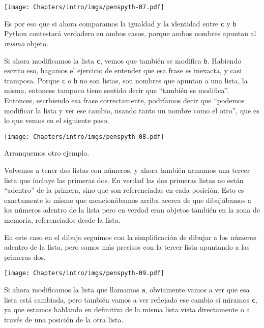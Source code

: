 
\begin{center}
    \texttt{[image: Chapters/intro/imgs/penspyth-07.pdf]}
\end{center}

Es por eso que si ahora comparamos la igualdad y la identidad entre \verb|c| y \verb|b| Python contestará verdadero en ambos casos, porque ambos nombres apuntan al \textit{mismo} objeto.

Si ahora modificamos la lista \verb|c|, vemos que también se modifica \verb|b|. Habiendo escrito eso, hagamos el ejercicio de entender que esa frase es inexacta, y casi tramposa. Porque \verb|c| o \verb|b| no son listas, son nombres que apuntan a una lista, la misma, entonces tampoco tiene sentido decir que ``también se modifica''. Entonces, escrbiendo esa frase correctamente, podríamos decir que ``podemos modificar la lista y ver ese cambio, usando tanto un nombre como el otro'', que es lo que vemos en el siguiente paso.


\begin{center}
    \texttt{[image: Chapters/intro/imgs/penspyth-08.pdf]}
\end{center}

Arranquemos otro ejemplo. 

Volvemos a tener dos listas con números, y ahora también armamos una tercer lista que incluye las primeras dos. En verdad las dos primeras listas no están ``adentro'' de la primera, sino que son referenciadas en cada posición. Esto es exactamente lo mismo que mencionábamos arriba acerca de que dibujábamos a los números adentro de la lista pero en verdad eran objetos también en la zona de memoria, referenciados desde la lista. 

En este caso en el dibujo seguimos con la simplificación de dibujar a los números adentro de la lista, pero somos más precisos con la tercer lista apuntando a las primeras dos.


\begin{center}
    \texttt{[image: Chapters/intro/imgs/penspyth-09.pdf]}
\end{center}

Si ahora modificamos la lista que llamamos \verb|a|, obviamente vamos a ver que esa lista está cambiada, pero también vamos a ver reflejado ese cambio si miramos \verb|c|, ya que estamos hablando en definitiva de la misma lista vista directamente o a través de una posición de la otra lista.

